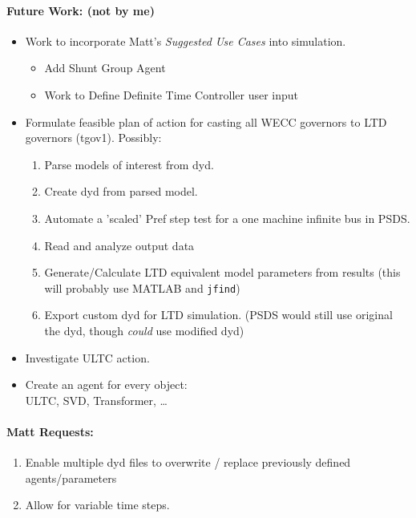 \documentclass[12pt]{article}
\begin{document}
\begin{multicols}{2}
\begin{enumerate}
\paragraph{Future Work: (not by me)}
\begin{itemize}
\item Work to incorporate Matt's \emph{Suggested Use Cases} into simulation.
		\begin{itemize}
		\item Add Shunt Group Agent
		\item Work to Define Definite Time Controller user input
		\end{itemize} 
\item Formulate feasible plan of action for casting all WECC governors to LTD governors (tgov1). Possibly:
		\begin{enumerate}
		\item Parse models of interest from dyd.
		\item Create dyd from parsed model.
		\item Automate a 'scaled' Pref step test for a one machine infinite bus in PSDS.
		\item Read and analyze output data
		\item Generate/Calculate LTD equivalent model parameters from results (this will probably use MATLAB and \verb|jfind|)
		\item Export custom dyd for LTD simulation. (PSDS would still use original the dyd, though \emph{could} use modified dyd)
		\end{enumerate}

		\item Investigate ULTC action.

		\item Create an agent for every object: \\ ULTC, SVD, Transformer, \ldots
		
\end{itemize}

\paragraph{Matt Requests:}
\begin{enumerate}
		\item Enable multiple dyd files to overwrite / replace previously defined agents/parameters
		\item Allow for variable time steps.
\end{enumerate}

	\end{enumerate}

		

\vfill\null

\end{multicols}
\pagebreak
\end{document}
